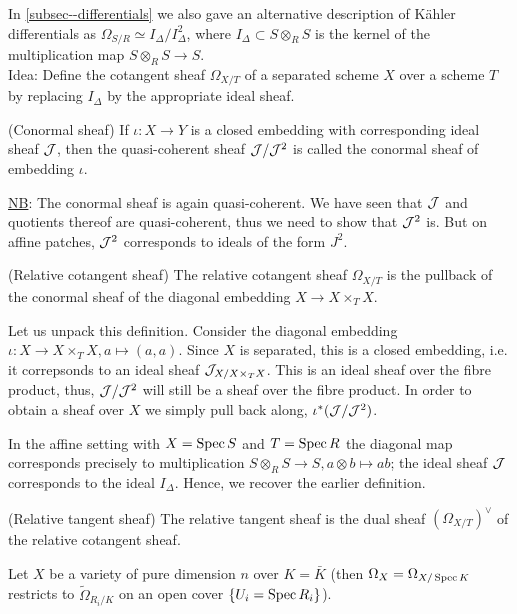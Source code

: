 \documentclass[a4paper,11pt]{article}
\begin{document}
			\noindent In \autoref{subsec--differentials} we also gave an alternative description of K{\"a}hler differentials as $\Omega_{S/R}\simeq I_\Delta/I_\Delta^2$, where $I_\Delta\subset S\otimes_RS$ is the kernel of the multiplication map $S\otimes_RS\rightarrow S$.
			\\

			\noindent Idea: Define the cotangent sheaf $\Omega_{X/T}$ of a separated scheme $X$ over a scheme $T$ by replacing $I_\Delta$ by the appropriate ideal sheaf.

			\begin{defi}
				(Conormal sheaf) If $\iota:X\rightarrow Y$ is a closed embedding with corresponding ideal sheaf $\mathcal{J}$, then the quasi-coherent sheaf $\mathcal{J}/\mathcal{J}^2$ is called the conormal sheaf of embedding $\iota$. 
			\end{defi}

			\noindent\underline{NB}: The conormal sheaf is again quasi-coherent. We have seen that $\mathcal{J}$ and quotients thereof are quasi-coherent, thus we need to show that $\mathcal{J}^2$ is. But on affine patches, $\mathcal{J}^2$ corresponds to ideals of the form $J^2$.

			\begin{defi}
				(Relative cotangent sheaf) The relative cotangent sheaf $\Omega_{X/T}$ is the pullback of the conormal sheaf of the diagonal embedding $X\rightarrow X\times_T X$.
			\end{defi}

			\noindent Let us unpack this definition. Consider the diagonal embedding $\iota:X\rightarrow X\times_TX,a\mapsto(a,a)$. Since $X$ is separated, this is a closed embedding, i.e. it correpsonds to an ideal sheaf $\mathcal{J}_{X/X\times_TX}$. This is an ideal sheaf over the fibre product, thus, $\mathcal{J}/\mathcal{J}^2$ will still be a sheaf over the fibre product. In order to obtain a sheaf over $X$ we simply pull back along, $\iota^\ast(\mathcal{J}/\mathcal{J}^2)$. 

			In the affine setting with $X=\operatorname{Spec} S$ and $T=\operatorname{Spec} R$ the diagonal map corresponds precisely to multiplication $S\otimes_RS\rightarrow S,a\otimes b\mapsto ab$; the ideal sheaf $\mathcal{J}$ corresponds to the ideal $I_\Delta$. Hence, we recover the earlier definition.
			
			\begin{defi}
				(Relative tangent sheaf) The relative tangent sheaf is the dual sheaf $(\Omega_{X/T})^\vee$ of the relative cotangent sheaf.
			\end{defi}

			Let $X$ be a variety of pure dimension $n$ over $K=\bar{K}$ (then $\Omega_X=\Omega_{X/\operatorname{Spec} K}$ restricts to $\widetilde{\Omega}_{R_i/K}$ on an open cover $\{U_i=\operatorname{Spec} R_i\}$).
\end{document}
